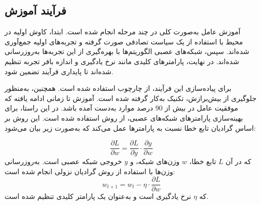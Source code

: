 	
	

	
	
	
	
	

\subsection{فرآیند آموزش}

آموزش عامل به‌صورت کلی در چند مرحله انجام شده است. ابتدا، کاوش اولیه در محیط با استفاده از یک سیاست تصادفی صورت گرفته و تجربه‌های اولیه جمع‌آوری شده‌اند. سپس، شبکه‌های عصبی الگوریتم‌ها با بهره‌گیری از این تجربه‌ها به‌روزرسانی شده‌اند. در نهایت، پارامترهای کلیدی مانند نرخ یادگیری و اندازه بافر تجربه تنظیم شده‌اند تا پایداری فرآیند تضمین شود.

برای پیاده‌سازی این فرآیند، از چارچوب  استفاده شده است. همچنین، به‌منظور جلوگیری از بیش‌برازش، تکنیک  به‌کار گرفته شده است. آموزش تا زمانی ادامه یافته که موفقیت عامل در بیش از 90 درصد موارد به‌دست آمده باشد. در این راستا، برای بهینه‌سازی پارامترهای شبکه‌های عصبی، از روش  استفاده شده است. این روش بر اساس گرادیان تابع خطا نسبت به پارامترها عمل می‌کند که به‌صورت زیر بیان می‌شود:
































\begin{equation}
	\frac{\partial L}{\partial w} = \frac{\partial L}{\partial y} \cdot \frac{\partial y}{\partial w}
\end{equation}
که در آن \( L \) تابع خطا، \( w \) وزن‌های شبکه، و \( y \) خروجی شبکه عصبی است. 
به‌روزرسانی وزن‌ها با استفاده از روش گرادیان نزولی انجام شده است:
\begin{equation}
	w_{t+1} = w_t - \eta \cdot \frac{\partial L}{\partial w}
\end{equation}
که \( \eta \) نرخ یادگیری است و به‌عنوان یک پارامتر کلیدی تنظیم شده است.




